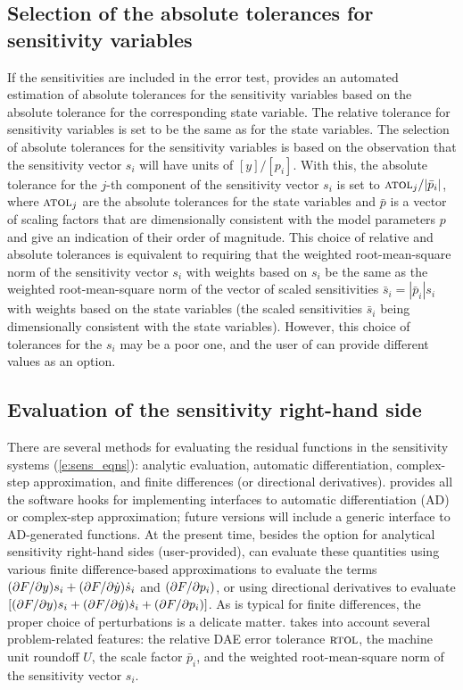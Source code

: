 \subsection{Selection of the absolute tolerances for sensitivity variables}
If the sensitivities are included in the error
test, {\idas} provides an
automated estimation of absolute tolerances for the sensitivity variables
based on the absolute tolerance for the corresponding state variable.
The relative tolerance for sensitivity variables is set to be the same as for
the state variables. The selection of absolute tolerances for the sensitivity
variables is based on the observation that the sensitivity vector $s_i$ will have
units of $[y]/[p_i]$.
With this, the absolute tolerance for the $j$-th component of the sensitivity
vector $s_i$ is set to ${\mbox{\sc atol}_j}/{|{\bar p}_i|}$, where
$\mbox{\sc atol}_j$ are the absolute tolerances for the state variables and $\bar p$
is a vector of scaling factors that are dimensionally consistent with
the model parameters $p$ and give an indication of their order of magnitude.
This choice of relative and absolute tolerances is equivalent
to requiring that the weighted root-mean-square norm of the sensitivity
vector $s_i$ with weights based on $s_i$ be the same as the
weighted root-mean-square norm of the vector of scaled sensitivities
${\bar s}_i = |{\bar p}_i| s_i$ with weights based on the state variables
(the scaled sensitivities ${\bar s}_i$ being dimensionally consistent with the
state variables).
%
However, this choice of tolerances for the $s_i$ may be a poor one, and the user
of {\idas} can provide different values as an option.

\subsection{Evaluation of the sensitivity right-hand side}
There are several methods for evaluating the residual functions in the sensitivity
systems (\ref{e:sens_eqns}): analytic evaluation, automatic differentiation,
complex-step approximation, and finite differences (or directional derivatives).
{\idas} provides all the software hooks for implementing interfaces to
automatic differentiation (AD) or complex-step approximation; future versions
will include a generic interface to AD-generated functions.
At the present time, besides the option for analytical sensitivity right-hand
sides (user-provided), {\idas} can evaluate these quantities using various finite
difference-based approximations to evaluate the terms $(\partial F / \partial y) s_i + (\partial F / \partial \dot y) \dot s_i$
and $(\partial F / \partial p_i)$, or using directional derivatives to evaluate
$\left[ (\partial F / \partial y) s_i + (\partial F / \partial \dot y) \dot s_i + (\partial F / \partial p_i) \right]$.
As is typical for finite differences, the proper choice of perturbations is a
delicate matter. {\idas} takes into account several problem-related features:
the relative DAE error tolerance $\mbox{\sc rtol}$, the machine unit roundoff $U$,
the scale factor ${\bar p}_i$, and the weighted root-mean-square norm of the
sensitivity vector $s_i$.

